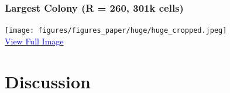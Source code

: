 \documentclass[10pt,t]{beamer}
\begin{document}
\begin{frame}
    \frametitle{Largest Colony (R = 260, 301k cells)}

    \begin{center}
        {\texttt{[image: figures/figures\_paper/huge/huge\_cropped.jpeg]}}\\[0.6em]
        \small
        \href{https://home.cit.tum.de/~ler/bacteria/videos/huge_high_quality.jpeg}{\textcolor{blue}{{View Full Image}}}
    \end{center}
\end{frame}



\section{Discussion}
\end{document}
